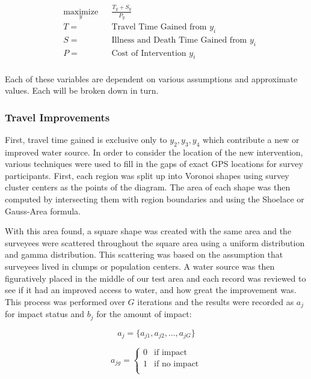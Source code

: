 \begin{equation}
\begin{aligned}
& \underset{y}{\text{maximize}}
& & \frac{T_y + S_y}{P_y}  \\
& T =
& & \text{Travel Time Gained from } y_i \\
& S =
& & \text{Illness and Death Time Gained from } y_i \\
& P =
& & \text{Cost of Intervention } y_i \\
\end{aligned}
\end{equation}

Each of these variables are dependent on various assumptions and approximate values.
Each will be broken down in turn.

\subsubsection*{Travel Improvements}
First, travel time gained is exclusive only to $y_2,y_3,y_4$ which contribute a new or improved water source.
In order to consider the location of the new intervention, various techniques were used to fill in the gaps of exact GPS locations for survey participants.
First, each region was split up into Voronoi shapes using survey cluster centers as the points of the diagram. %
The area of each shape was then computed by intersecting them with region boundaries and using the Shoelace or Gauss-Area formula. %

With this area found, a square shape was created with the same area and the surveyees were scattered throughout the square area using a uniform distribution and gamma distribution.
This scattering was based on the assumption that surveyees lived in clumps or population centers.
A water source was then figuratively placed in the middle of our test area and each record was reviewed to see if it had an improved access to water, and how great the improvement was.
This process was performed over $G$ iterations and the results were recorded as $a_j$ for impact status and $b_j$ for the amount of impact:


\begin{equation*}
a_j = \{a_{j1},a_{j2},...,a_{jG}\}
\end{equation*}

\begin{equation*}
a_{jg} =
\left\{
\begin{array}{ll}
      0 & \text{if impact}\\
      1 & \text{if no impact} \\
\end{array}
\right.
\end{equation*}


